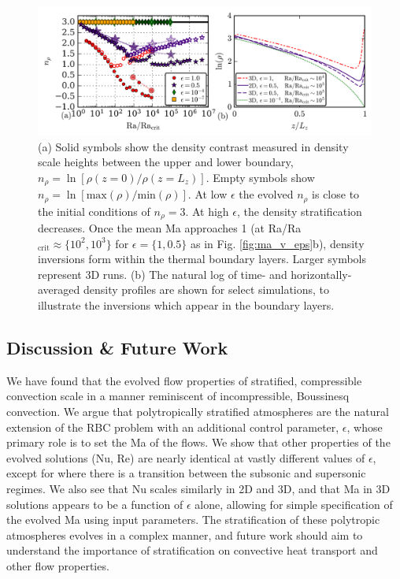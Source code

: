 \begin{figure}[t!]
\includegraphics[width=\textwidth]{./figs/density_v_ra.pdf}
\caption{\label{fig:nrho_v_ra} 
(a) Solid symbols show the density contrast measured
in density scale heights between the upper and lower boundary, 
$n_\rho = \ln[\rho(z=0)/\rho(z=L_z)]$.
Empty symbols show 
$n_\rho = \ln[\text{max}(\rho)/\text{min}(\rho)]$. 
At low $\epsilon$ the evolved
$n_{\rho}$ is close to the initial conditions of $n_\rho = 3$.  
At high $\epsilon$,
the density stratification decreases.  Once the mean 
Ma approaches 1 (at Ra/Ra$_{\text{crit}} \approx \{10^2, 10^3\}$ for $\epsilon = \{1, 0.5\}$
as in Fig. \ref{fig:ma_v_eps}b), density inversions form within the thermal
boundary layers. Larger symbols represent 3D runs. (b) The natural log of time-
and horizontally-averaged density profiles are shown for select simulations,
to illustrate the inversions which appear in the boundary layers.}
\end{figure}

\vspace{-0.5cm}
\subsection{Discussion \& Future Work}
We have found that the evolved flow properties of stratified,
compressible convection scale in a manner reminiscent of incompressible,
Boussinesq \RB convection.
We argue that polytropically stratified atmospheres are the natural
extension of the RBC problem with an additional control parameter, $\epsilon$,
whose primary role is to set the Ma of the flows.  We show that other properties
of the evolved solutions (Nu, Re) are nearly identical at vastly different values
of $\epsilon$, except for where there is a transition between the subsonic
and supersonic regimes.  We also see that Nu scales similarly in 2D and 3D,
and that Ma in 3D solutions appears to be a function of $\epsilon$ alone,
allowing for simple specification of the evolved Ma using input parameters.
The stratification of 
these polytropic atmospheres evolves in a complex
manner, and future work should aim to 
understand the importance of stratification on
convective heat transport and other flow properties.

